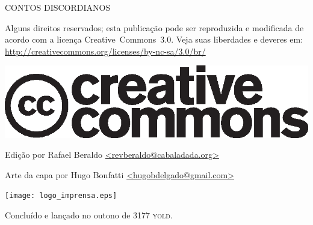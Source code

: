 \thispagestyle{empty}
\begin{center}
{\tiny
CONTOS DISCORDIANOS

\vspace{.5cm}

\begin{minipage}[h]{.6\textwidth}
Alguns direitos reservados; esta publicação pode ser reproduzida e modificada de acordo com a licença \foreignlanguage{english}{Creative~Commons~3.0}. Veja suas liberdades e deveres em: \url{http://creativecommons.org/licenses/by-nc-sa/3.0/br/}
	\begin{center}
	\includegraphics[scale=.2]{cc.eps}
	\end{center}
\end{minipage}

\vspace{.5cm}

\begin{minipage}[h]{.6\textwidth}
\centering
Edição por Rafael Beraldo \url{<revberaldo@cabaladada.org>}

	\vspace{.2em}

Arte da capa por Hugo Bonfatti \url{<hugobdelgado@gmail.com>}
\end{minipage}

\vfill

\begin{minipage}[h]{.6\textwidth}
\centering
	\texttt{[image: logo\_imprensa.eps]}

Concluído e lançado no outono de 3177 \textsc{yold}.
\end{minipage}
}
\end{center}
\newpage

